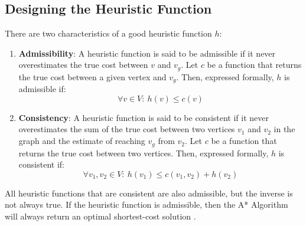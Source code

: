 \documentclass[conference]{IEEEtran}
\begin{document}
\subsection{Designing the Heuristic Function}
There are two characteristics of a good heuristic function $h$:
\begin{enumerate}
    \item \textbf{Admissibility}: A heuristic function is said to be admissible if it never overestimates the true cost between $v$ and $v_g$. Let $c$ be a function that returns the true cost between a given vertex and $v_g$. Then, expressed formally, $h$ is admissible if:
    \[\forall v \in V: \ h(v) \leq c(v)\]

    \item \textbf{Consistency}: A heuristic function is said to be consistent if it never overestimates the sum of the true cost between two vertices $v_1$ and $v_2$ in the graph and the estimate of reaching $v_g$ from $v_2$. Let $c$ be a function that returns the true cost between two vertices. Then, expressed formally, $h$ is consistent if:
    \[\forall v_1, v_2 \in V: \ h(v_1) \leq c(v_1, v_2) + h(v_2)\]

\end{enumerate}

All heuristic functions that are consistent are also admissible, but the inverse is not always true. If the heuristic function is admissible, then the A* Algorithm will always return an optimal shortest-cost solution \cite{hart_formal_1968}. 
\end{document}

